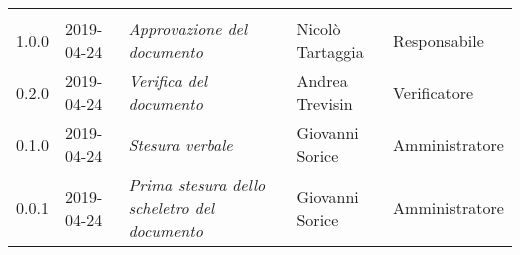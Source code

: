 \newpage 
\section*{}
	\begin{longtable}{C{2cm}|C{2.5cm}|C{4.5cm}|C{2.5cm}|C{3cm}}
	
	 &  &  &  &   \\
	\endhead
		
		1.0.0 & 2019-04-24 & \emph{Approvazione del documento} & Nicolò Tartaggia & Responsabile \\
		\hline
		
		0.2.0 & 2019-04-24 & \emph{Verifica del documento} & Andrea Trevisin & Verificatore \\
		\hline

		 0.1.0 & 2019-04-24 & \emph{Stesura verbale} & Giovanni Sorice  & Amministratore\\
		\hline
		
		 0.0.1 & 2019-04-24 & \emph{Prima stesura dello scheletro del documento} & Giovanni Sorice & Amministratore\\
	
\end{longtable}


\clearpage